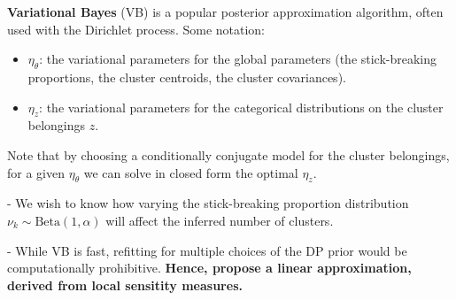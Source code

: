 \documentclass[a0,plainsections,30pt]{sciposter}\usepackage[]{graphicx}\usepackage[]{color}
\newcommand{\etazopt}{\eta_z^{*}}
\newcommand{\etathetaopt}{\eta_\theta^{*}}
\DeclareMathOperator*{\argmin}{arg\,min}
\begin{document}
\begin{minipage}[t]{0.45\textwidth}
% 
% 

\vspace{-0.3in}

\textbf{Variational Bayes} (VB) is a popular posterior approximation
algorithm, often used with the Dirichlet process. Some notation: 

\begin{itemize}
\item $\eta_\theta$: the variational parameters for the global parameters (the stick-breaking proportions, the cluster centroids, the cluster covariances). 
\item $\eta_z$: the variational parameters for the categorical distributions on the 
cluster belongings $z$. 
\end{itemize}

Note that by choosing a conditionally conjugate model for the cluster belongings, for a given $\eta_\theta$ we can solve in closed form the optimal $\eta_z$.

\begin{mdframed}[style=MyFrame]
- We wish to know how varying the stick-breaking proportion distribution $\nu_k \sim \text{Beta}(1, \alpha)$ will affect the inferred number of clusters. 

- While VB is fast, refitting for multiple choices of the DP prior would be
computationally prohibitive. {\bf Hence, propose a linear approximation, derived from local sensitity measures. }
\end{mdframed}




\end{minipage}
\end{document}
